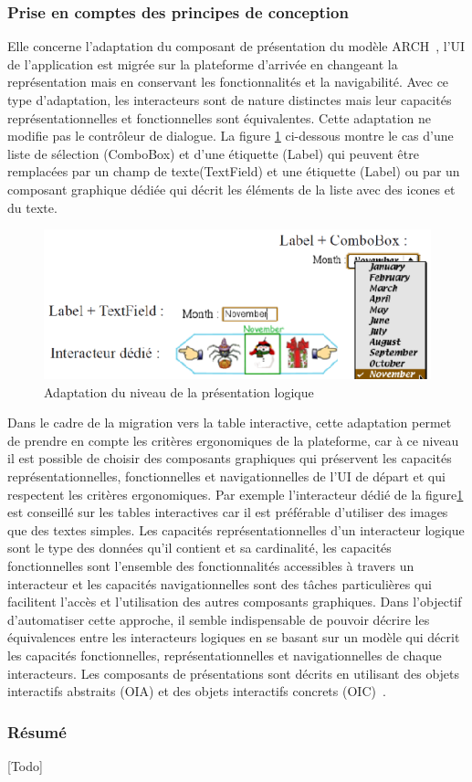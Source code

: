 \subsubsection{ Prise en comptes des principes de conception }
Elle concerne l'adaptation du composant de présentation du modèle ARCH~\cite{Pfaff1985}, l'UI de l'application est migrée sur la plateforme d'arrivée en changeant la représentation mais en conservant les fonctionnalités et la navigabilité. Avec ce type d'adaptation, les interacteurs sont de nature distinctes mais leur capacités représentationnelles et fonctionnelles sont équivalentes. Cette adaptation ne modifie pas le contrôleur de dialogue. La figure \ref{fig:chap3:3} ci-dessous montre le cas d'une liste de sélection (ComboBox) et d'une étiquette (Label) qui peuvent être remplacées par un champ de texte(TextField) et une étiquette (Label) ou par un composant graphique dédiée qui décrit les éléments de la liste avec des icones et du texte. 
\begin{figure}[ht]
\begin{center}
\label{fig:chap3:3}
\caption{Adaptation du niveau de la présentation logique}
\includegraphics[scale=1]{chap3/img-4} 
\end{center}
\end{figure}
Dans le cadre de la migration vers la table interactive, cette adaptation permet de prendre en compte les critères ergonomiques de la plateforme, car à ce niveau il est possible de choisir des composants graphiques qui préservent les capacités représentationnelles, fonctionnelles et navigationnelles de l'UI de départ et qui respectent les critères ergonomiques. Par exemple l'interacteur dédié de la figure\ref{fig:chap3:3} est conseillé sur les tables interactives car il est préférable d'utiliser des images que des textes simples. Les capacités représentationnelles d'un interacteur logique sont le type des données qu'il contient et sa cardinalité, les capacités fonctionnelles sont l'ensemble des fonctionnalités accessibles à travers un interacteur et les capacités navigationnelles sont des tâches particulières qui facilitent l'accès et l'utilisation des autres composants graphiques. 
Dans l'objectif d'automatiser cette approche, il semble indispensable de pouvoir décrire les équivalences entre les interacteurs logiques en se basant sur un modèle qui décrit les capacités fonctionnelles, représentationnelles et navigationnelles de chaque interacteurs. Les composants de présentations sont décrits en utilisant des objets interactifs abstraits (OIA) et des objets interactifs concrets (OIC)~\cite{Vanderdonckt1993}.

\subsubsection{Résumé}
[Todo]

